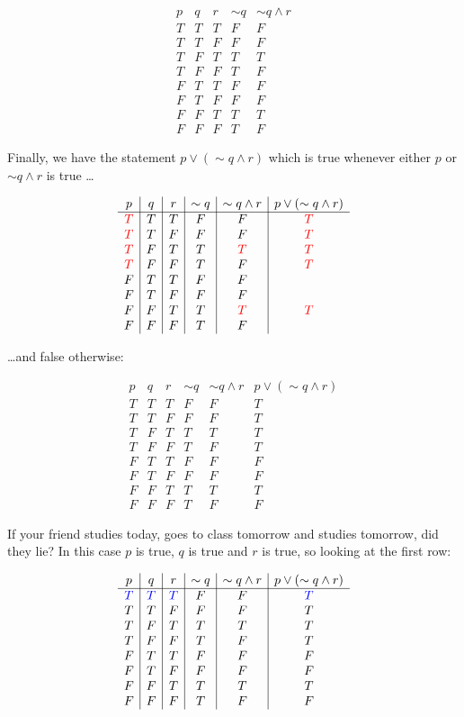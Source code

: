  $$\begin{array}{c|c|c|c|c}
p&q&r&\sim q & \sim q \wedge r\\
\hline
T & T&T&F&F\\
T&T&F&F&F \\
T&F&T&T&T\\
T&F&F&T&F\\
F & T&T&F&F\\
F&T&F&F&F\\
F&F&T&T&T\\
F&F&F&T&F
\end{array}$$

Finally, we have the statement $p\vee (\sim q \wedge r)$ which is true whenever either $p$ or $\sim q \wedge r$ is true \ldots


 $$\begin{array}{c|c|c|c|c|c}
p&q&r&\sim q & \sim q \wedge r& p\vee(\sim q \wedge r)\\
\hline
\textcolor{red}{T} & T&T&F&F&\textcolor{red}{T}\\
\textcolor{red}{T}&T&F&F&F&\textcolor{red}{T} \\
\textcolor{red}{T}&F&T&T&\textcolor{red}{T}&\textcolor{red}{T}\\
\textcolor{red}{T}&F&F&T&F&\textcolor{red}{T}\\
F & T&T&F&F\\
F&T&F&F&F\\
F&F&T&T&\textcolor{red}{T}&\textcolor{red}{T}\\
F&F&F&T&F
\end{array}$$

\ldots and false otherwise:


 $$\begin{array}{c|c|c|c|c|c}
p&q&r&\sim q & \sim q \wedge r& p\vee (\sim q \wedge r)\\
\hline
T & T&T&F&F&T\\
T&T&F&F&F&T \\
T&F&T&T&T&T\\
T&F&F&T&F&T\\
F & T&T&F&F&F\\
F&T&F&F&F&F\\
F&F&T&T&T&T\\
F&F&F&T&F&F
\end{array}$$

If your friend studies today, goes to class tomorrow and studies tomorrow, did they lie?  In this case $p$ is true, $q$ is true and $r$ is true, so looking at the first row:

 $$\begin{array}{c|c|c|c|c|c}
p&q&r&\sim q & \sim q \wedge r& p\vee (\sim q \wedge r)\\
\hline
\textcolor{blue}{T} & \textcolor{blue}T&\textcolor{blue}T&F&F&\textcolor{blue}T\\
T&T&F&F&F&T \\
T&F&T&T&T&T\\
T&F&F&T&F&T\\
F & T&T&F&F&F\\
F&T&F&F&F&F\\
F&F&T&T&T&T\\
F&F&F&T&F&F
\end{array}$$

